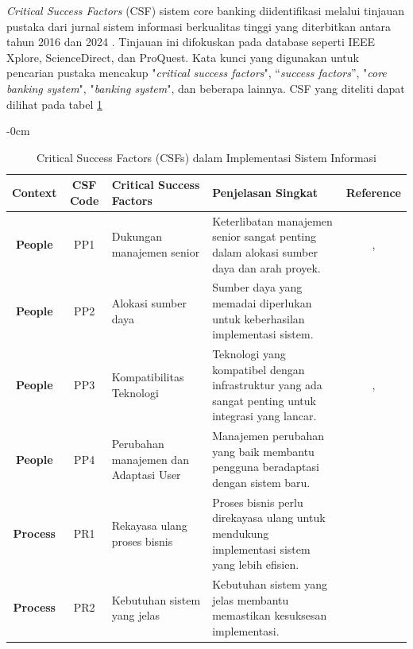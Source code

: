 \documentclass[journal,article,submit,pdftex,moreauthors]{Definitions/mdpi}
\begin{document}
\textit{Critical Success Factors} (CSF) sistem core banking diidentifikasi melalui tinjauan pustaka dari jurnal sistem informasi berkualitas tinggi yang diterbitkan antara tahun 2016 dan 2024 \cite{Ghafari-csf} \cite{falisat-csf} \cite{salu-csf} \cite{johny-csf}. Tinjauan ini difokuskan pada database seperti IEEE Xplore, ScienceDirect, dan ProQuest. Kata kunci yang digunakan untuk pencarian pustaka mencakup "\textit{critical success factors}", “\textit{success factors}”, "\textit{core banking system}", "\textit{banking system}", dan beberapa lainnya. CSF yang diteliti dapat dilihat pada tabel \ref{csf-table}


\begin{table}[h!]
\begin{adjustwidth}{-\extralength}{0cm}
    \caption{Critical Success Factors (CSFs) dalam Implementasi Sistem Informasi}
    \label{csf-table}
    \centering
    \begin{tabular}{c|c|p{4cm}|p{6cm}|c}
        \toprule
        \textbf{Context} & \textbf{CSF Code} & \textbf{Critical Success Factors} & \textbf{Penjelasan Singkat} & \textbf{Reference} \\ 
        \midrule
        \textbf{People} & PP1 & \raggedright Dukungan manajemen senior & \raggedright Keterlibatan manajemen senior sangat penting dalam alokasi sumber daya dan arah proyek. & \cite{Ghafari-csf}, \cite{falisat-csf} \\ 
        \midrule
        \textbf{People} & PP2 & \raggedright Alokasi sumber daya & \raggedright Sumber daya yang memadai diperlukan untuk keberhasilan implementasi sistem. & \cite{falisat-csf} \\ 
        \midrule
        \textbf{People} & PP3 & \raggedright Kompatibilitas Teknologi & \raggedright Teknologi yang kompatibel dengan infrastruktur yang ada sangat penting untuk integrasi yang lancar. & \cite{salu-csf}, \cite{johny-csf} \\ 
        \midrule
        \textbf{People} & PP4 & \raggedright Perubahan manajemen dan Adaptasi User & \raggedright Manajemen perubahan yang baik membantu pengguna beradaptasi dengan sistem baru. & \cite{Ghafari-csf} \\ 
        \midrule
        \textbf{Process} & PR1 & \raggedright Rekayasa ulang proses bisnis & \raggedright Proses bisnis perlu direkayasa ulang untuk mendukung implementasi sistem yang lebih efisien. & \cite{falisat-csf} \\ 
        \midrule
        \textbf{Process} & PR2 & \raggedright Kebutuhan sistem yang jelas & \raggedright Kebutuhan sistem yang jelas membantu memastikan kesuksesan implementasi. & \cite{johny-csf} \\ 

\end{tabular}
\end{adjustwidth}
\end{table}
\end{document}
